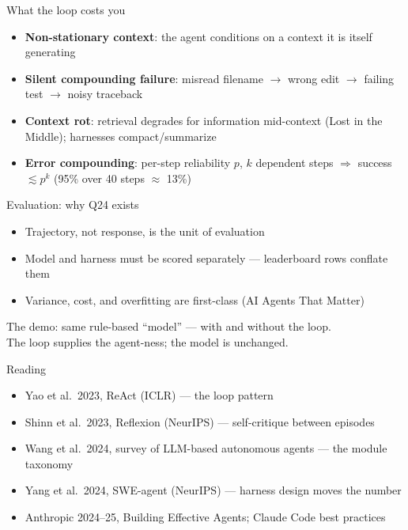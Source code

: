\documentclass[aspectratio=169,11pt]{beamer}
\begin{document}
\begin{frame}{What the loop costs you}
\begin{itemize}
\item \textbf{Non-stationary context}: the agent conditions on a context it is itself generating
\item \textbf{Silent compounding failure}: misread filename $\to$ wrong edit $\to$ failing test $\to$ noisy traceback
\item \textbf{Context rot}: retrieval degrades for information mid-context (Lost in the Middle); harnesses compact/summarize
\item \textbf{Error compounding}: per-step reliability $p$, $k$ dependent steps $\Rightarrow$ success $\lesssim p^k$ (95\% over 40 steps $\approx$ 13\%)
\end{itemize}
\end{frame}

\begin{frame}{Evaluation: why Q24 exists}
\begin{itemize}
\item Trajectory, not response, is the unit of evaluation
\item Model and harness must be scored separately --- leaderboard rows conflate them
\item Variance, cost, and overfitting are first-class (AI Agents That Matter)
\end{itemize}
\vspace{0.4em}
The demo: same rule-based ``model'' --- with and without the loop.\\
The loop supplies the agent-ness; the model is unchanged.
\end{frame}

\begin{frame}{Reading}
\begin{itemize}
\item Yao et al.\ 2023, ReAct (ICLR) --- the loop pattern
\item Shinn et al.\ 2023, Reflexion (NeurIPS) --- self-critique between episodes
\item Wang et al.\ 2024, survey of LLM-based autonomous agents --- the module taxonomy
\item Yang et al.\ 2024, SWE-agent (NeurIPS) --- harness design moves the number
\item Anthropic 2024--25, Building Effective Agents; Claude Code best practices
\end{itemize}
\end{frame}
\end{document}
